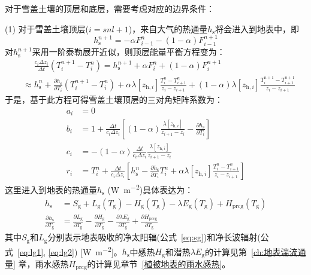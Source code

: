 对于雪盖土壤的顶层和底层，需要考虑对应的边界条件：

(1) 对于雪盖土壤顶层($i=snl+1$)，来自大气的热通量$h_{\mathrm {s}} $将会进入到地表中，即
\begin{equation}
  h_{\mathrm{s}}^{n+1}=-\alpha F_{i-1}^{n}-(1-\alpha) F_{i-1}^{n+1}
\end{equation}
对$h_{\mathrm {s}} ^{n+1}$采用一阶泰勒展开近似，则顶层能量平衡方程变为：
\begin{equation}
  \begin{split}
    &\mathrel{\phantom{\approx}}\frac{c_{i} \Delta z_{i}}{\Delta t}\left(T_{i}^{n+1}-T_{i}^{n}\right)=h_{\mathrm{s}}^{n+1}+\alpha F_{i}^{n}+(1-\alpha) F_{i}^{n+1} \\[1ex]
    &\approx h_{\mathrm{s}}^{n}+\frac{\partial h_{\mathrm{s}}}{\partial T_{i}}\left(T_{i}^{n+1}-T_{i}^{n}\right)+\alpha \lambda\left[z_{\mathrm{h},i}\right] \frac{T_{i}^{n}-T_{i+1}^{n}}{z_{i}-z_{i+1}}+(1-\alpha) \lambda\left[z_{\mathrm{h},i}\right] \frac{T_{i}^{n+1}-T_{i+1}^{n+1}}{z_{i}-z_{i+1}}
  \end{split}
\end{equation}
于是，基于此方程可得雪盖土壤顶层的三对角矩阵系数为：
\begin{equation}
  \begin{aligned}
    a_{i} &= 0 \\[1ex]
    b_{i} &= 1+\frac{\Delta t}{c_{i} \Delta z_{i}}\left[(1-\alpha) \frac{\lambda\left[z_{\mathrm{h},i}\right]}{z_{i+1}-z_{i}}-\frac{\partial h_{\mathrm{s}}}{\partial T_{i}}\right] \\[1ex]
    c_{i} &= -(1-\alpha) \frac{\Delta t}{c_{i} \Delta z_{i}} \frac{\lambda\left[z_{\mathrm{h},i}\right]}{z_{i+1}-z_{i}} \\[1ex]
    r_{i} &= T_{i}^{n}+\frac{\Delta t}{c_{i} \Delta z_{i}}\left[h_{\mathrm{s}}^{n}-\frac{\partial h_{\mathrm{s}}}{\partial T_{i}} T_{i}^{n}+\alpha \lambda\left[z_{\mathrm{h},i}\right] \frac{T_{i}^{n}-T_{i+1}^{n}}{z_{i}-z_{i+1}}\right]
  \end{aligned}
\end{equation}
这里进入到地表的热通量$h_{\mathrm {s}} $ (\unit{W.m^{-2}})具体表达为：
\begin{equation}
  \begin{aligned}
    h_{\mathrm{s}} &= S_{\mathrm{g}}+L_{\mathrm{g}}\left(T_{\mathrm{g}}\right)-H_{\mathrm{g}}\left(T_{\mathrm{g}}\right)-\lambda E_{\mathrm{g}}\left(T_{\mathrm{g}}\right)+H_{\mathrm{p r c g}}\left(T_{\mathrm{g}}\right) \\[1.5ex]
    \frac{\partial h_{\mathrm{s}}}{\partial T_{\mathrm{g}}} &= \frac{\partial L_{\mathrm{g}}}{\partial T_{\mathrm{g}}}-\frac{\partial H_{\mathrm{g}}}{\partial T_{\mathrm{g}}}-\frac{\partial \lambda E_{\mathrm{g}}}{\partial T_{\mathrm{g}}}+\frac{\partial H_{\mathrm{p r c g}}}{\partial T_{\mathrm{g}}}
  \end{aligned}
\end{equation}
其中$S_{\mathrm {g}} $和$L_{\mathrm {g}} $分别表示地表吸收的净太阳辐(公式~\eqref{eq:sg})和净长波辐射(公式~\eqref{eq:lg1}, \eqref{eq:lg2}) [\unit{W.m^{-2}}]。$h_{\mathrm {s}} $中感热$H_{\mathrm{g}}$和潜热$\lambda E_{\mathrm {g}} $的计算见第~\ref{ch:地表湍流通量} 章，雨水感热$H_{\mathrm{prcg}}$的计算见章节~\ref{植被地表的雨水感热}。

